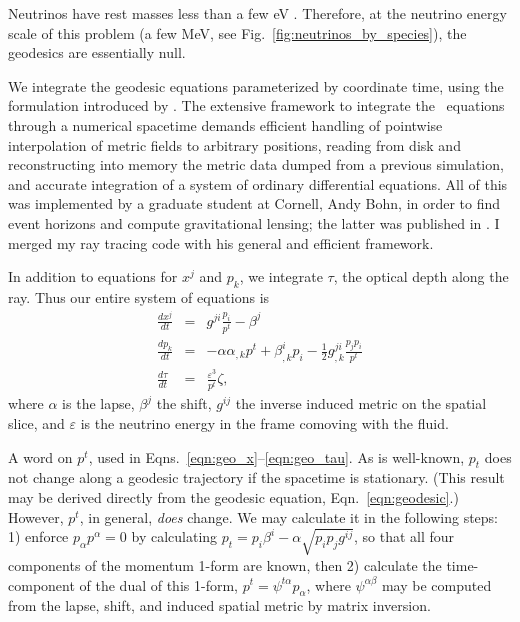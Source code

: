 Neutrinos have rest masses less than a few eV \citep{oliv2014-pdg}.
Therefore, at the neutrino energy scale
of this problem (a few MeV, see Fig.~\ref{fig:neutrinos_by_species}), the
geodesics are essentially null.

We integrate the geodesic equations parameterized by coordinate time,
using the formulation introduced by \cite{hugh1994-eh_finding}.
The extensive framework to integrate the \citeauthor{hugh1994-eh_finding}\
equations through a numerical spacetime demands efficient handling of
pointwise interpolation of metric fields to arbitrary positions, reading from
disk and reconstructing into memory the metric data dumped from a previous
simulation, and accurate integration of a system of ordinary differential
equations.
All of this was implemented by a graduate student at Cornell, Andy Bohn, in order
to find event horizons and compute gravitational lensing; the latter was
published in \cite{bohn2015-lensing}.
I merged my ray tracing code with his general and efficient framework.

In addition to equations for $x^j$ and $p_k$, we integrate $\tau$, the optical
depth along the ray. Thus our entire system of equations is
\begin{eqnarray}
  \label{eqn:geo_x}
  \frac{dx^j}{dt} &=& g^{ji}\frac{p_i}{p^t} - \beta^j \\
  \label{eqn:geo_p}
  \frac{dp_k}{dt} &=& -\alpha \alpha_{,k}p^t + \beta^i_{,k}p_i
  - \frac{1}{2}g^{ji}_{,k} \frac{p_jp_i}{p^t} \\
  \label{eqn:geo_tau}
  \frac{d\tau}{dt} &=& \frac{\varepsilon^3}{p^t} \zeta,
\end{eqnarray}
where $\alpha$ is the lapse, $\beta^j$ the shift, $g^{ij}$ the inverse
induced metric on the spatial slice, and $\varepsilon$ is the neutrino
energy in the frame comoving with the fluid.

A word on $p^t$, used in Eqns.~\ref{eqn:geo_x}--\ref{eqn:geo_tau}.
As is well-known, $p_t$ does not change along a geodesic trajectory if the
spacetime is stationary. (This result may be derived directly from the geodesic
equation, Eqn.~\ref{eqn:geodesic}.)
However, $p^t$, in general, \emph{does} change. We may calculate it in the
following steps: 1) enforce $p_\alpha p^\alpha=0$ by calculating
$p_t=p_i\beta^i-\alpha\sqrt{p_ip_jg^{ij}}$, so that all four components of the
momentum 1-form are known, then 2) calculate the time-component of the dual of
this 1-form, $p^t=\psi^{t\alpha}p_\alpha$, where $\psi^{\alpha\beta}$ may be
computed from the lapse, shift, and induced spatial metric by matrix inversion.

